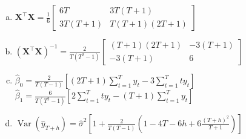 \documentclass[a4paper,UTF8]{article}
\numberwithin{equation}{section}
\begin{document}
\begin{enumerate}
\begin{enumerate}[a.]
	\item $\boldsymbol{X}^\top \boldsymbol{X}=\frac{1}{6}\left[\begin{array}{cc}6 T & 3 T(T+1) \\ 3 T(T+1) & T(T+1)(2 T+1)\end{array}\right]$
	\item $\left(\boldsymbol{X}^\top \boldsymbol{X}\right)^{-1}=\frac{2}{T\left(T^2-1\right)}\left[\begin{array}{cc}(T+1)(2 T+1) & -3(T+1) \\ -3(T+1) & 6\end{array}\right]$
	\item $\hat{\beta}_0=\frac{2}{T(T-1)}\left[(2 T+1) \sum_{t=1}^T y_t-3 \sum_{t=1}^T t y_t\right]$
	$
	\hat{\beta}_1=\frac{6}{T\left(T^2-1\right)}\left[2 \sum_{t=1}^T t y_t-(T+1) \sum_{t=1}^T y_t\right]
	$
	\item $\operatorname{Var}\left(\hat{y}_{T+h}\right)=\hat{\sigma}^2\left[1+\frac{2}{T(T-1)}\left(1-4 T-6 h+6 \frac{(T+h)^2}{T+1}\right)\right]$
\end{enumerate}



\end{enumerate}
\end{document}

